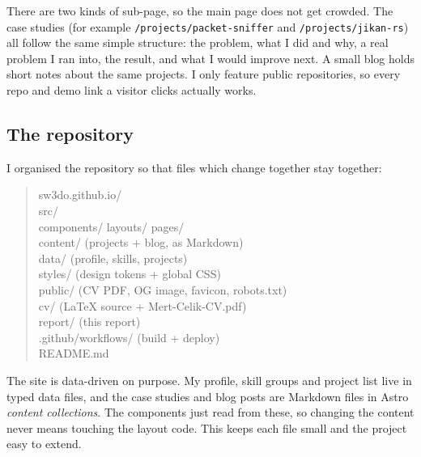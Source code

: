 \documentclass[11pt,a4paper]{article}
\begin{document}
There are two kinds of sub-page, so the main page does not get crowded. The case studies (for example \texttt{/projects/packet-sniffer} and \texttt{/projects/jikan-rs}) all follow the same simple structure: the problem, what I did and why, a real problem I ran into, the result, and what I would improve next. A small blog holds short notes about the same projects. I only feature public repositories, so every repo and demo link a visitor clicks actually works.

\subsection{The repository}
I organised the repository so that files which change together stay together:

\begin{quote}\small\ttfamily
sw3do.github.io/\\
\hspace*{1em}src/\\
\hspace*{2em}components/  layouts/  pages/\\
\hspace*{2em}content/     (projects + blog, as Markdown)\\
\hspace*{2em}data/        (profile, skills, projects)\\
\hspace*{2em}styles/      (design tokens + global CSS)\\
\hspace*{1em}public/      (CV PDF, OG image, favicon, robots.txt)\\
\hspace*{1em}cv/          (LaTeX source + Mert-Celik-CV.pdf)\\
\hspace*{1em}report/      (this report)\\
\hspace*{1em}.github/workflows/  (build + deploy)\\
\hspace*{1em}README.md
\end{quote}

The site is data-driven on purpose. My profile, skill groups and project list live in typed data files, and the case studies and blog posts are Markdown files in Astro \textit{content collections}. The components just read from these, so changing the content never means touching the layout code. This keeps each file small and the project easy to extend.
\end{document}
